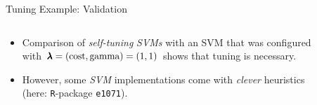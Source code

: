 \begin{frame}{Tuning Example: Validation}

\begin{columns}
\begin{column}{0.4\textwidth}
  \footnotesize

  \begin{itemize}
    \item<1-> Comparison of \textit{self-tuning} \emph{SVMs} with an SVM that was configured with $\pmb{\lambda} = (\text{cost},\text{gamma}) = (1,1)$ shows that tuning is necessary.
    \item<2-> However, some \emph{SVM} implementations come with \emph{clever} heuristics (here: \texttt{R}-package \texttt{e1071}).
  \end{itemize}
\end{column}
\begin{column}{0.6\textwidth}
  \begin{figure}
  \end{figure}
\end{column}
\end{columns}
\end{frame}

